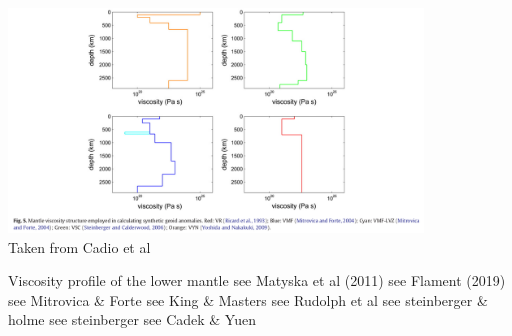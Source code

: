 \begin{center}
\includegraphics[width=11cm]{images/viscosity_profile/capd11}\\
{\captionfont Taken from Cadio et al \cite{capd11} }
\end{center}

\Literature Viscosity profile of the lower mantle \cite{elss85}
see Matyska et al (2011) \cite{mayw11}
see Flament (2019) \cite{flam19}
see Mitrovica \& Forte \cite{mifo04}
see King \& Masters \cite{kima92}
see Rudolph et al \cite{rull15}
see steinberger \& holme \cite{stho08}
see steinberger \cite{stei16}
see Cadek \& Yuen \cite{cayu93}
